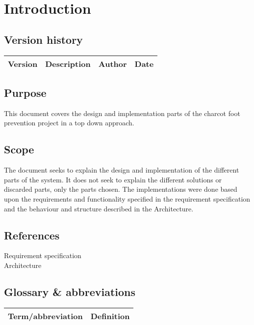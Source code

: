 \chapter{Introduction}
\section{Version history}
\begin{table}[H]
\begin{tabular}{|c|p{9cm}|c|c|}
\hline
Version & Description & Author & Date\\
\hline
\end{tabular}
\end{table}

\section{Purpose}
This document covers the design and implementation parts of the charcot foot prevention project in a top down approach.

\section{Scope}
The document seeks to explain the design and implementation of the different parts of the system. It does not seek to explain the different solutions or discarded parts, only the parts chosen. The implementations were done based upon the requirements and functionality specified in the requirement specification and the behaviour and structure described in the Architecture.

\section{References}
Requirement specification \\
Architecture \\

\section{Glossary \& abbreviations}
\begin{table}[H]
\centering
\begin{tabular}{|p{4cm}|p{7cm}|}
\hline
Term/abbreviation & Definition\\ \hline
\end{tabular}
\end{table}
